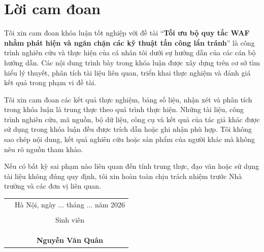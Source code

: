 \chapter*{Lời cam đoan}

Tôi xin cam đoan khóa luận tốt nghiệp với đề tài ``\textbf{Tối ưu bộ quy tắc WAF nhằm phát hiện và ngăn chặn các kỹ thuật tấn công lẩn tránh}'' là công trình nghiên cứu và thực hiện của cá nhân tôi dưới sự hướng dẫn của các cán bộ hướng dẫn. Các nội dung trình bày trong khóa luận được xây dựng trên cơ sở tìm hiểu lý thuyết, phân tích tài liệu liên quan, triển khai thực nghiệm và đánh giá kết quả trong phạm vi đề tài.

Tôi xin cam đoan các kết quả thực nghiệm, bảng số liệu, nhận xét và phân tích trong khóa luận là trung thực theo quá trình thực hiện. Những tài liệu, công trình nghiên cứu, mã nguồn, bộ dữ liệu, công cụ và kết quả của tác giả khác được sử dụng trong khóa luận đều được trích dẫn hoặc ghi nhận phù hợp. Tôi không sao chép nội dung, kết quả nghiên cứu hoặc sản phẩm của người khác mà không nêu rõ nguồn tham khảo.

Nếu có bất kỳ sai phạm nào liên quan đến tính trung thực, đạo văn hoặc sử dụng tài liệu không đúng quy định, tôi xin hoàn toàn chịu trách nhiệm trước Nhà trường và các đơn vị liên quan.

\vspace{1.5cm}

\begin{table}[h]
\begin{tabular}{p{}c}
 & Hà Nội, ngày ... tháng ... năm 2026 \\
 & \\
 & Sinh viên \\
 &              \\
 &              \\
 &              \\
 & \textbf{Nguyễn Văn Quân} \\
\end{tabular}
\end{table}
